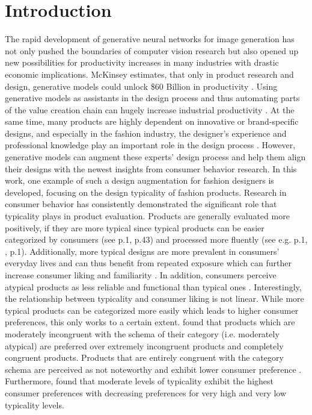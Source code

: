 \section{Introduction}
The rapid development of generative neural networks for image generation has not only pushed the boundaries of computer vision research but also opened up new possibilities for productivity increases in many industries with drastic economic implications. McKinsey estimates, that only in product research and design, generative models could unlock \$60 Billion in productivity \citep{mc_kinsey_report}. Using generative models as assistants in the design process and thus automating parts of the value creation chain can hugely increase industrial productivity \cite[p.1]{regenwetter2022deep}. At the same time, many products are highly dependent on innovative or brand-specific designs, and especially in the fashion industry, the designer's experience and professional knowledge play an important role in the design process \cite[p.3]{sharma2021development}. However, generative models can augment these experts' design process and help them align their designs with the newest insights from consumer behavior research. In this work, one example of such a design augmentation for fashion designers is developed, focusing on the design typicality of fashion products. Research in consumer behavior has consistently demonstrated the significant role that typicality plays in product evaluation. Products are generally evaluated more positively, if they are more typical since typical products can be easier categorized by consumers (see \cite{barsalou1985ideals} p.1, \cite{sujan1985consumer} p.43) and processed more fluently (see e.g. \cite{veryzer1998influence} p.1, \cite{winkielman2006prototypes}, p.1). Additionally, more typical designs are more prevalent in consumers' everyday lives and can thus benefit from repeated exposure which can further increase consumer liking and familiarity \citep[p.23]{zajonc1968attitudinal}. In addition, consumers perceive atypical products as less reliable and functional than typical ones \cite[p.613]{schnurr2017impact}. Interestingly, the relationship between typicality and consumer liking is not linear. While more typical products can be categorized more easily which leads to higher consumer preferences, this only works to a certain extent. \cite{meyers1989schema} found that products which are moderately incongruent with the schema of their category (i.e. moderately atypical) are preferred over extremely incongruent products and completely congruent products. Products that are entirely congruent with the category schema are perceived as not noteworthy and exhibit lower consumer preference \cite[p.40]{meyers1989schema}. Furthermore, \cite{liu2017effects} found that moderate levels of typicality exhibit the highest consumer preferences with decreasing preferences for very high and very low typicality levels. \\
